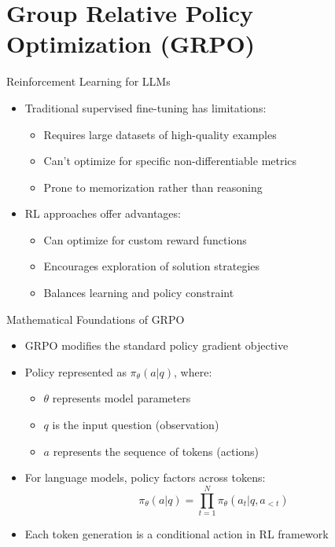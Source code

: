 \documentclass{beamer}
\begin{document}
\section{Group Relative Policy Optimization (GRPO)}

\begin{frame}{Reinforcement Learning for LLMs}
  \begin{itemize}
    \item Traditional supervised fine-tuning has limitations:
    \begin{itemize}
      \item Requires large datasets of high-quality examples
      \item Can't optimize for specific non-differentiable metrics
      \item Prone to memorization rather than reasoning
    \end{itemize}
    \item RL approaches offer advantages:
    \begin{itemize}
      \item Can optimize for custom reward functions
      \item Encourages exploration of solution strategies
      \item Balances learning and policy constraint
    \end{itemize}
  \end{itemize}
\end{frame}

\begin{frame}{Mathematical Foundations of GRPO}
  \begin{itemize}
    \item GRPO modifies the standard policy gradient objective
    \item Policy represented as $\pi_\theta(a|q)$, where:
    \begin{itemize}
      \item $\theta$ represents model parameters
      \item $q$ is the input question (observation)
      \item $a$ represents the sequence of tokens (actions)
    \end{itemize}
    \item For language models, policy factors across tokens:
    \begin{equation}
      \pi_\theta(a|q) = \prod_{t=1}^{N} \pi_\theta(a_t|q, a_{<t})
    \end{equation}
    \item Each token generation is a conditional action in RL framework
  \end{itemize}
\end{frame}
\end{document}
